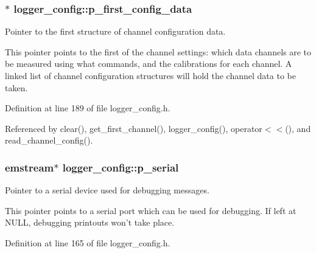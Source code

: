 \hypertarget{classlogger__config_aa522d8c1a166234b677909cea6580cf5}{
\subsubsection[{p\-\_\-first\-\_\-config\-\_\-data}]{$\ast$ logger\-\_\-config\-::p\-\_\-first\-\_\-config\-\_\-data\hspace{0.3cm}{\ttfamily [protected]}}}\label{classlogger__config_aa522d8c1a166234b677909cea6580cf5}


Pointer to the first structure of channel configuration data. 

This pointer points to the first of the channel settings\-: which data channels are to be measured using what commands, and the calibrations for each channel. A linked list of channel configuration structures will hold the channel data to be taken. 

Definition at line 189 of file logger\-\_\-config.\-h.



Referenced by clear(), get\-\_\-first\-\_\-channel(), logger\-\_\-config(), operator$<$$<$(), and read\-\_\-channel\-\_\-config().

\hypertarget{classlogger__config_ab21ca3930913e75c8e4c6cc2163f4bd7}{
\subsubsection[{p\-\_\-serial}]{\setlength{\rightskip}{0pt plus 5cm}emstream$\ast$ logger\-\_\-config\-::p\-\_\-serial\hspace{0.3cm}{\ttfamily [protected]}}}\label{classlogger__config_ab21ca3930913e75c8e4c6cc2163f4bd7}


Pointer to a serial device used for debugging messages. 

This pointer points to a serial port which can be used for debugging. If left at {\ttfamily N\-U\-L\-L}, debugging printouts won't take place. 

Definition at line 165 of file logger\-\_\-config.\-h.



